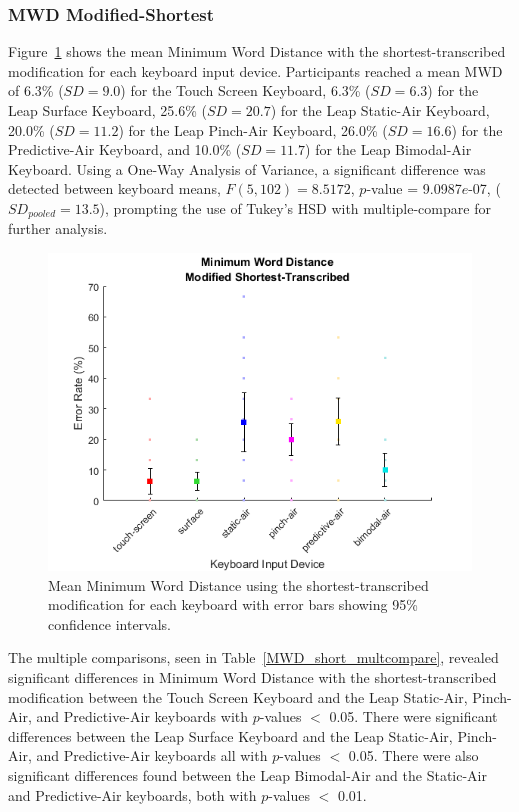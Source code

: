 \subsubsection{MWD Modified-Shortest}
Figure~\ref{fig_MWD_short_mean} shows the mean Minimum Word Distance with the shortest-transcribed modification for each keyboard input device. Participants reached a mean MWD of 6.3\% ($SD = 9.0$) for the Touch Screen Keyboard, 6.3\% ($SD = 6.3$) for the Leap Surface Keyboard, 25.6\% ($SD = 20.7$) for the Leap Static-Air Keyboard, 20.0\% ($SD = 11.2$) for the Leap Pinch-Air Keyboard, 26.0\% ($SD = 16.6$) for the Predictive-Air Keyboard, and 10.0\% ($SD = 11.7$) for the Leap Bimodal-Air Keyboard. Using a One-Way Analysis of Variance, a significant difference was detected between keyboard means, $F(5, 102) = 8.5172$, $p$-value = 9.0987$e$-07, ($SD_{pooled} = 13.5$), prompting the use of Tukey's HSD with multiple-compare for further analysis.

\begin{figure}[h]
	\centering
	\includegraphics{fig_MWD_short_mean}
	\caption[Mean Minimum Word Distance for Modified-Shortest]{Mean Minimum Word Distance using the shortest-transcribed modification for each keyboard with error bars showing 95\% confidence intervals.}
	\label{fig_MWD_short_mean}
\end{figure}

The multiple comparisons, seen in Table~\ref{MWD_short_multcompare}, revealed significant differences in Minimum Word Distance with the shortest-transcribed modification between the Touch Screen Keyboard and the Leap Static-Air, Pinch-Air, and Predictive-Air keyboards with $p$-values $<$ 0.05. There were significant differences between the Leap Surface Keyboard and the Leap Static-Air, Pinch-Air, and Predictive-Air keyboards all with $p$-values $<$ 0.05. There were also significant differences found between the Leap Bimodal-Air and the Static-Air and Predictive-Air keyboards, both with $p$-values $<$ 0.01.

